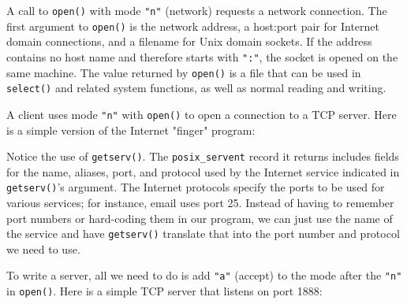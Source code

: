A call to \texttt{open()} with mode
\texttt{"n"} (network) requests a network
connection. The first argument to \texttt{open()} is the network
address, a host:port pair for Internet domain connections, and a
filename for Unix domain sockets. If the address contains no host name
and therefore starts with \texttt{":"}, the
socket is opened on the same machine. The value returned by
\texttt{open()} is a file that can be used in \texttt{select()} and
related system functions, as well as normal reading and writing. 

A client uses mode
\texttt{"n"} with \texttt{open()} to open a
connection to a TCP server. Here is a simple version of the Internet
"finger" program:


Notice the use of \texttt{getserv()}. The
\texttt{posix\_servent} record it returns includes fields for the name,
aliases, port, and protocol used by the Internet service indicated in
\texttt{getserv()}'s argument. The Internet protocols
specify the ports to be used for various services; for instance, email
uses port 25. Instead of having to remember port numbers or hard-coding
them in our program, we can just use the name of the service and have
\texttt{getserv()} translate that into the port number and protocol we
need to use.

To write a server, all we need to do is add
\texttt{"a"} (accept) to the mode after the
\texttt{"n"} in \texttt{open()}. Here is a
simple TCP server that listens on port 1888:

